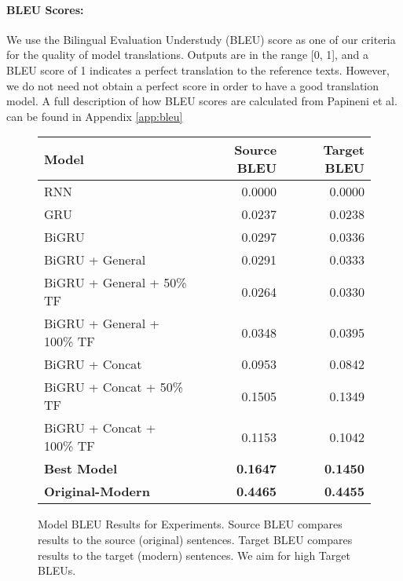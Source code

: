 \documentclass[twoside,twocolumn]{article}
\begin{document}
\paragraph{BLEU Scores:}
\label{sec:bleu}
We use the Bilingual Evaluation Understudy (BLEU) score as one of our criteria
for the quality of model translations. Outputs are in the range [0, 1], and a
BLEU score of 1 indicates a perfect translation to the reference texts.
However, we do not need not obtain a perfect score in order to have a good
translation model. A full description of how BLEU scores
are calculated from Papineni et al. \cite{papineni2002bleu} can be found in
Appendix \ref{app:bleu}

\begin{figure*}
    \centering
    \begin{tabular}{ |l|r|r| }
        \hline
        \textbf{Model}
          & \textbf{Source BLEU} & \textbf{Target BLEU} \\
        \hline
        RNN                             & 0.0000 & 0.0000 \\ \hline
        GRU                             & 0.0237 & 0.0238 \\ \hline
        BiGRU                           & 0.0297 & 0.0336 \\ \hline
        BiGRU + General                 & 0.0291 & 0.0333 \\ \hline
        BiGRU + General + 50\% TF       & 0.0264 & 0.0330 \\ \hline
        BiGRU + General + 100\% TF      & 0.0348 & 0.0395 \\ \hline
        BiGRU + Concat                  & 0.0953 & 0.0842 \\ \hline
        BiGRU + Concat + 50\% TF        & 0.1505 & 0.1349 \\ \hline
        BiGRU + Concat + 100\% TF       & 0.1153 & 0.1042 \\ \hline
        \textbf{Best Model}             & \textbf{0.1647} & \textbf{0.1450} \\ \hline
        \textbf{Original-Modern}  & \textbf{0.4465} & \textbf{0.4455} \\ \hline
    \end{tabular}
    \caption{Model BLEU Results for Experiments. Source BLEU compares results
    to the source (original) sentences. Target BLEU compares results to
    the target (modern) sentences. We aim for high Target BLEUs.}
    \label{fig:model-bleu}
\end{figure*}
\end{document}
